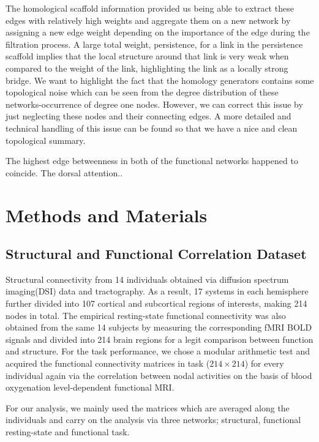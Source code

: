 \documentclass[9pt,twocolumn,twoside,lineno]{pnas-new}
\begin{document}
The homological scaffold information provided us being able to extract these edges with relatively high weights and aggregate them on a new network by assigning a new edge weight depending on the importance of the edge during the filtration process. A large total weight, persistence, for a link in the persistence scaffold implies that the local structure around that link is very weak when compared to the weight of the link, highlighting the link as a locally strong bridge. 
We want to highlight the fact that the homology generators contains some topological noise which can be seen from the degree distribution of these networks-occurrence of degree one nodes. However, we can correct this issue by just neglecting these nodes and their connecting edges. A more detailed and technical handling of this issue can be found \cite{optimalc1,optimalc2} so that we have a nice and clean topological summary. 

The highest edge betweenness in both of the functional networks happened to coincide. The dorsal attention..

\section*{Methods and Materials}

\subsection{Structural and Functional Correlation Dataset} Structural connectivity from 14 individuals obtained via diffusion spectrum imaging(DSI) data and tractography. As a result, 17 systems in each hemisphere further divided into 107 cortical and subcortical regions of interests, making 214 nodes in total.
The empirical resting-state functional connectivity was also obtained from the same 14 subjects by measuring the corresponding fMRI BOLD signals and divided into 214 brain regions for a legit comparison between function and structure. For the task performance, we chose a modular arithmetic test and acquired the functional connectivity matrices in task ($214\times 214$) for every individual again via the correlation between nodal activities on the basis of blood oxygenation level-dependent functional MRI. 

For our analysis, we mainly used the matrices which are averaged along the individuals and carry on the analysis via three networks; structural, functional resting-state and functional task.
\end{document}
